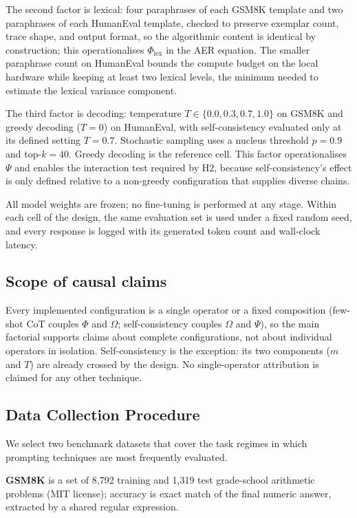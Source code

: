 \documentclass[conference]{IEEEtran}
\begin{document}
The second factor is lexical: four paraphrases of each GSM8K template
and two paraphrases of each HumanEval template, checked to preserve
exemplar count, trace shape, and output format, so the algorithmic
content is identical by construction; this operationalises
$\Phi_{\mathrm{lex}}$ in the AER equation.  The smaller paraphrase
count on HumanEval bounds the compute budget on the local hardware
while keeping at least two lexical levels, the minimum needed to
estimate the lexical variance component.

The third factor is decoding: temperature $T \in \{0.0, 0.3, 0.7,
1.0\}$ on GSM8K and greedy decoding ($T = 0$) on HumanEval, with
self-consistency evaluated only at its defined setting $T = 0.7$.
Stochastic sampling uses a nucleus threshold $p = 0.9$ and top-$k =
40$.  Greedy decoding is the reference cell.  This factor
operationalises $\Psi$ and enables the interaction test required by
H2, because self-consistency's effect is only defined relative to a
non-greedy configuration that supplies diverse chains.

All model weights are frozen; no fine-tuning is performed at any
stage.  Within each cell of the design, the same evaluation set is
used under a fixed random seed, and every response is logged with its
generated token count and wall-clock latency.

\subsection{Scope of causal claims}
\label{sec:method-components}

Every implemented configuration is a single operator or a fixed
composition (few-shot CoT couples $\Phi$ and $\Omega$;
self-consistency couples $\Omega$ and $\Psi$), so the main factorial
supports claims about complete configurations, not about individual
operators in isolation.  Self-consistency is the exception: its two
components ($m$ and $T$) are already crossed by the design.  No
single-operator attribution is claimed for any other technique.

\subsection{Data Collection Procedure}
\label{sec:method-data}

We select two benchmark datasets that cover the task regimes in which
prompting techniques are most frequently evaluated.

\textbf{GSM8K} \cite{b18} is a set of 8,792 training and 1,319 test
grade-school arithmetic problems (MIT license); accuracy is exact
match of the final numeric answer, extracted by a shared regular
expression.
\end{document}
